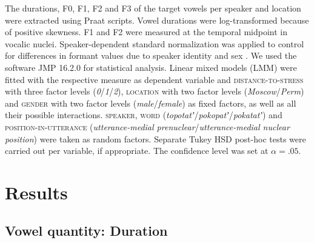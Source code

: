 \documentclass[output=paper,colorlinks,citecolor=black]{langscibook}
\begin{document}
The durations, F0, F1, F2 and F3 of the target vowels per speaker and location were extracted using Praat scripts. Vowel durations were log-transformed because of positive skewness. F1 and F2 were measured at the temporal midpoint in vocalic nuclei. Speaker-dependent standard normalization was applied to control for differences in formant values due to speaker identity and sex \citep{Lobanov1971}. We used the software JMP 16.2.0 for statistical analysis. Linear mixed models (LMM) were fitted with the respective measure as dependent variable and \textsc{distance-to-stress} with three factor levels (\textit{0}/\textit{1}/\textit{2}), \textsc{location} with two factor levels (\textit{Moscow}/\textit{Perm}) and \textsc{gender} with two factor levels (\textit{male}/\textit{female}) as fixed factors, as well as all their possible interactions. \textsc{speaker}, \textsc{word} (\textit{topotatʼ}{\slash}\textit{po\-ko\-patʼ}{\slash}\textit{pokatatʼ}) and \textsc{position-in-utterance} (\textit{utterance-medial prenuclear}{\slash}\textit{ut\-ter\-ance-me\-di\-al nuclear position}) were taken as random factors. Separate Tukey HSD post-hoc tests were carried out per variable, if appropriate. The confidence level was set at $α = .05$.

\section{Results}
\subsection{Vowel quantity: Duration}
\end{document}
